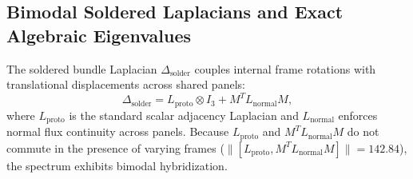 \documentclass[11pt,a4paper]{article}
\theoremstyle{definition}
\begin{document}
\subsection{Bimodal Soldered Laplacians and Exact Algebraic Eigenvalues}

The soldered bundle Laplacian $\Delta_{\mathrm{solder}}$ couples internal frame rotations with translational displacements across shared panels:
\begin{equation}
\Delta_{\mathrm{solder}} = L_{\mathrm{proto}} \otimes I_3 + M^T L_{\mathrm{normal}} M,
\end{equation}
where $L_{\mathrm{proto}}$ is the standard scalar adjacency Laplacian and $L_{\mathrm{normal}}$ enforces normal flux continuity across panels. Because $L_{\mathrm{proto}}$ and $M^T L_{\mathrm{normal}} M$ do not commute in the presence of varying frames ($\|[L_{\mathrm{proto}}, M^T L_{\mathrm{normal}} M]\| = 142.84$), the spectrum exhibits bimodal hybridization.
\end{document}
